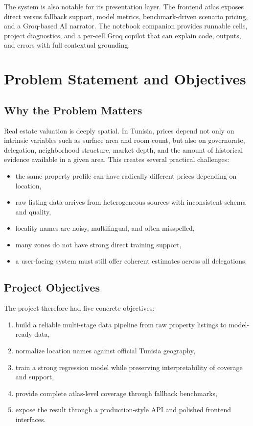\documentclass[11pt,a4paper]{article}
\begin{document}
The system is also notable for its presentation layer. The frontend atlas exposes direct versus fallback support, model metrics, benchmark-driven scenario pricing, and a Groq-based AI narrator. The notebook companion provides runnable cells, project diagnostics, and a per-cell Groq copilot that can explain code, outputs, and errors with full contextual grounding.

\section{Problem Statement and Objectives}

\subsection{Why the Problem Matters}

Real estate valuation is deeply spatial. In Tunisia, prices depend not only on intrinsic variables such as surface area and room count, but also on governorate, delegation, neighborhood structure, market depth, and the amount of historical evidence available in a given area. This creates several practical challenges:

\begin{itemize}
\item the same property profile can have radically different prices depending on location,
\item raw listing data arrives from heterogeneous sources with inconsistent schema and quality,
\item locality names are noisy, multilingual, and often misspelled,
\item many zones do not have strong direct training support,
\item a user-facing system must still offer coherent estimates across all delegations.
\end{itemize}

\subsection{Project Objectives}

The project therefore had five concrete objectives:

\begin{enumerate}
\item build a reliable multi-stage data pipeline from raw property listings to model-ready data,
\item normalize location names against official Tunisia geography,
\item train a strong regression model while preserving interpretability of coverage and support,
\item provide complete atlas-level coverage through fallback benchmarks,
\item expose the result through a production-style API and polished frontend interfaces.
\end{enumerate}
\end{document}
